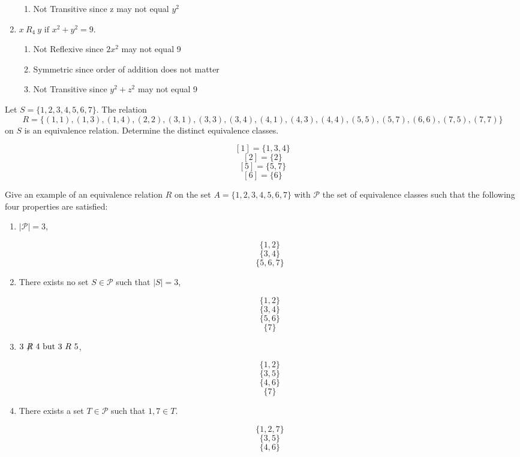 \documentclass{homework}
\begin{document}
\begin{enumerate}[label=(\alph*)]
\begin{sol}
\begin{enumerate}
              \item Not Transitive since z may not equal $y^2$
            \end{enumerate}
        \end{sol}
	\item $x \ R_4 \ y \text{ if } x^2 + y^2 = 9$.
        \begin{sol}
            \begin{enumerate}
             \item Not Reflexive since $2x^2$ may not equal 9
              \item Symmetric since order of addition does not matter
              \item Not Transitive since $y^2 + z^2$ may not equal 9
            \end{enumerate}
        \end{sol}
\end{enumerate}

\question Let $S = \{1,2,3,4,5,6,7\}$. The relation
\[
	R = \{(1, 1),(1, 3),(1, 4),(2, 2),(3, 1),(3, 3),(3, 4),(4, 1),(4, 3),(4, 4),(5, 5),(5, 7),(6, 6),(7, 5),(7, 7)\}
\]
on $S$ is an equivalence relation. Determine the distinct equivalence classes.

\begin{sol}
  \[[1]=\{1,3,4\}\]
  \[[2]=\{2\}\]
  \[[5]=\{5,7\}\]
  \[[6]=\{6\}\]
\end{sol}

\question Give an example of an equivalence relation $R$ on the set $A = \{1, 2, 3, 4, 5, 6, 7\}$ with $\mathcal{P}$ the set of equivalence classes such that the following four properties are satisfied:

\begin{enumerate}
	\item $|\mathcal{P}| = 3$,
        \begin{sol}
          \[\{1,2\}\]
          \[\{3,4\}\]
          \[\{5,6,7\}\]
        \end{sol}
	\item There exists no set $S \in \mathcal{P}$ such that $|S| = 3$,
        \begin{sol}
          \[\{1,2\}\]
          \[\{3,4\}\]
          \[\{5,6\}\]
          \[\{7\}\]
        \end{sol}
	\item $3 \ \mathord{\not\mathrel{R}} \ 4 \text{ but } 3 \ R \ 5$,
        \begin{sol}
          \[\{1,2\}\]
          \[\{3,5\}\]
          \[\{4,6\}\]
          \[\{7\}\]
        \end{sol}
	\item There exists a set $T \in \mathcal{P}$ such that $1, 7 \in T$.
        \begin{sol}      
          \[\{1,2,7\}\]
          \[\{3,5\}\]
          \[\{4,6\}\]
        \end{sol}
\end{enumerate}
\end{document}
